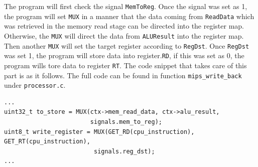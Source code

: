 \documentclass{homework}
\begin{document}
The program will first check the signal \texttt{MemToReg}. Once the signal was set as 1, the program will set \texttt{MUX} in a manner that the data coming from \texttt{ReadData} which was retrieved in the memory read stage can be directed into the register map. Otherwise, the \texttt{MUX} will direct the data from \texttt{ALUResult} into the register map. Then another \texttt{MUX} will set the target register according to \texttt{RegDst}. Once \texttt{RegDst} was set 1, the program will store data into register.\texttt{RD}, if this was set as 0, the program wills tore data to register \texttt{RT}. The code snippet that takes care of this part is as it follows. The full code can be found in function \texttt{mips_write_back} under \texttt{processor.c}.
\\
\begin{center}
\begin{code}
\begin{verbatim}
...
uint32_t to_store = MUX(ctx->mem_read_data, ctx->alu_result, 
                        signals.mem_to_reg);
uint8_t write_register = MUX(GET_RD(cpu_instruction), GET_RT(cpu_instruction),
                         signals.reg_dst);
...
\end{verbatim}
\end{code}
\end{center}
\end{document}
